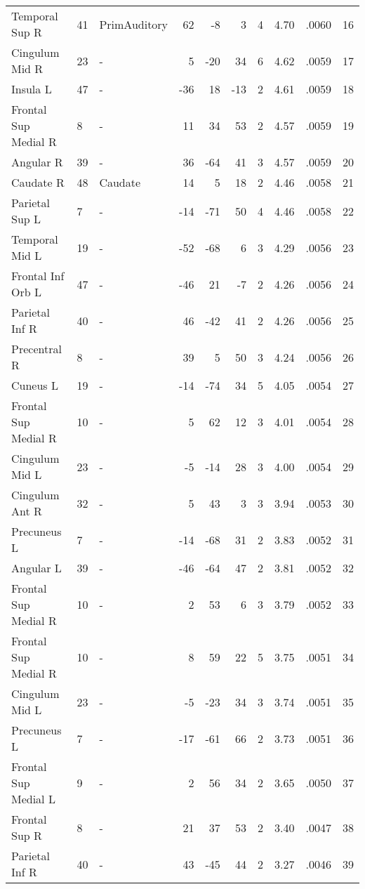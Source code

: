 \begin{table}
\begin{ThreePartTable}
\begin{tabularx}{\textwidth}{l l p{1.6cm} *{3}{r} *{2}{P{.8cm}} P{1.3cm} P{.5cm}}
    Temporal Sup R & 41 & PrimAuditory & 62 & -8 & 3 & 4 &4.70&.0060& 16 \\
    Cingulum Mid R & 23 & - & 5 & -20 & 34 & 6 &4.62&.0059& 17 \\
    Insula L & 47 & - & -36 & 18 & -13 & 2 &4.61&.0059& 18 \\
    Frontal Sup Medial R & 8 & - & 11 & 34 & 53 & 2 &4.57&.0059& 19 \\
    Angular R & 39 & - & 36 & -64 & 41 & 3 &4.57&.0059& 20 \\
    Caudate R & 48 & Caudate & 14 & 5 & 18 & 2 &4.46&.0058& 21 \\
    Parietal Sup L & 7 & - & -14 & -71 & 50 & 4 &4.46&.0058& 22 \\
    Temporal Mid L & 19 & - & -52 & -68 & 6 & 3 &4.29&.0056& 23 \\
    Frontal Inf Orb L & 47 & - & -46 & 21 & -7 & 2 &4.26&.0056& 24 \\
    Parietal Inf R & 40 & - & 46 & -42 & 41 & 2 &4.26&.0056& 25 \\
    Precentral R & 8 & - & 39 & 5 & 50 & 3 &4.24&.0056& 26 \\
    Cuneus L & 19 & - & -14 & -74 & 34 & 5 &4.05&.0054& 27 \\
    Frontal Sup Medial R & 10 & - & 5 & 62 & 12 & 3 &4.01&.0054& 28 \\
    Cingulum Mid L & 23 & - & -5 & -14 & 28 & 3 &4.00&.0054& 29 \\
    Cingulum Ant R & 32 & - & 5 & 43 & 3 & 3 &3.94&.0053& 30 \\
    Precuneus L & 7 & - & -14 & -68 & 31 & 2 &3.83&.0052& 31 \\
    Angular L & 39 & - & -46 & -64 & 47 & 2 &3.81&.0052& 32 \\
    Frontal Sup Medial R & 10 & - & 2 & 53 & 6 & 3 &3.79&.0052& 33 \\
    Frontal Sup Medial R & 10 & - & 8 & 59 & 22 & 5 &3.75&.0051& 34 \\
    Cingulum Mid L & 23 & - & -5 & -23 & 34 & 3 &3.74&.0051& 35 \\
    Precuneus L & 7 & - & -17 & -61 & 66 & 2 &3.73&.0051& 36 \\
    Frontal Sup Medial L & 9 & - & 2 & 56 & 34 & 2 &3.65&.0050& 37 \\
    Frontal Sup R & 8 & - & 21 & 37 & 53 & 2 &3.40&.0047& 38 \\
    Parietal Inf R & 40 & - & 43 & -45 & 44 & 2 &3.27&.0046& 39 \\
\bottomrule
    \end{tabularx}

\end{ThreePartTable}
\end{table}
